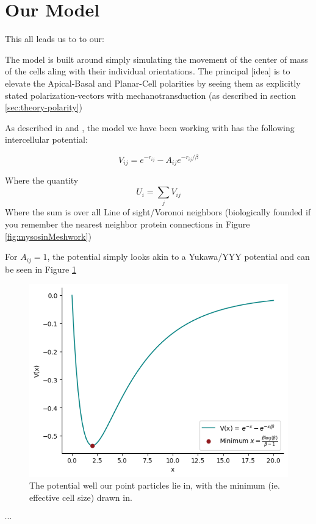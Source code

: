 \section{Our Model}
This all leads us to to our:


The model is built around simply simulating the movement of the center of mass of the cells aling with their individual orientations. The principal [idea] is to elevate the Apical-Basal and Planar-Cell polarities by seeing them as explicitly stated polarization-vectors with mechanotransduction (as described in section \ref{sec:theory-polarity})

As described in \cite{} and \cite{}, the model we have been working with has the following intercellular potential:

\begin{equation}
    V_{ij}=e^{-r_{ij}}-A_{ij}e^{-r_{ij}/\beta}
\end{equation}

Where the quantity 
\begin{equation}
    U_i = \sum_j V_{ij}
\end{equation}
Where the sum is over all Line of sight/Voronoi neighbors (biologically founded if you remember the nearest neighbor protein connections in Figure \ref{fig:mysosinMeshwork})

For $A_{ij}=1$, the potential simply looks akin to a Yukawa/YYY potential and can be seen in Figure \ref{fig:potential} 
\begin{figure}[H]
    \centering
    \includegraphics[width=0.7\linewidth]{chapters/Theory/figures/potential.png}
    \caption{The potential well our point particles lie in, with the minimum (ie. effective cell size) drawn in.}
    \label{fig:potential}
\end{figure}

$\cdots$


